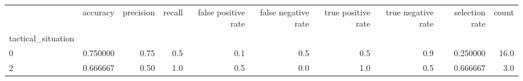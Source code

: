 \begin{tabular}{lrrrrrrrrr}
\toprule
{} &  accuracy &  precision &  recall &  false positive rate &  false negative rate &  true positive rate &  true negative rate &  selection rate &  count \\
tactical\_situation &           &            &         &                      &                      &                     &                     &                 &        \\
\midrule
0                  &  0.750000 &       0.75 &     0.5 &                  0.1 &                  0.5 &                 0.5 &                 0.9 &        0.250000 &   16.0 \\
2                  &  0.666667 &       0.50 &     1.0 &                  0.5 &                  0.0 &                 1.0 &                 0.5 &        0.666667 &    3.0 \\
\bottomrule
\end{tabular}
